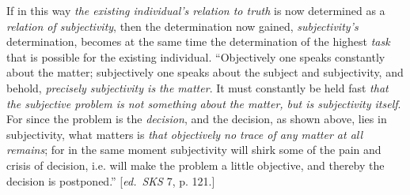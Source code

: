 \documentclass[12pt,a4paper,openany]{book}
\newcommand{\ed}[1]{{\small[\textit{ed.}\ #1]}}
\begin{document}
If in this way \emph{the existing individual's relation to truth} is now
determined as a \emph{relation of subjectivity}, then the determination now gained,
\emph{subjectivity's} determination, becomes at the same time the determination of
the highest \emph{task} that is possible for the existing individual. ``Objectively
one speaks constantly about the matter; subjectively one speaks about the subject and
subjectivity, and behold, \emph{precisely subjectivity is the matter}. It must constantly
be held fast \emph{that the subjective problem is not something about the matter, but is
subjectivity itself}. For since the problem is the \emph{decision}, and the decision,
as shown above, lies in subjectivity, what matters is \emph{that objectively
no trace of any matter at all remains}; for in the same moment subjectivity will
shirk some of the pain and crisis of decision, i.e.
will make the problem a little objective, and thereby the decision is postponed.''
\ed{\emph{SKS} 7, p. 121.}
\end{document}
